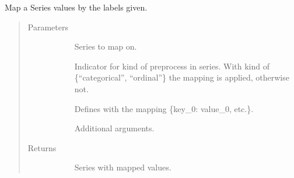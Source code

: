 \documentclass[letterpaper,10pt,english]{sphinxmanual}
\begin{document}
\begin{fulllineitems}
\label{\detokenize{autoapi/src/utils/preprocess/index:src.utils.preprocess.map_labels}}
Map a Series values by the labels given.
\begin{quote}\begin{description}
\item[{Parameters}] \leavevmode\begin{description}
\item[{}] \leavevmode
Series to map on.

\item[{}] \leavevmode
Indicator for kind of preprocess in series. With kind of \{“categorical”, “ordinal”\}  the mapping is applied,
otherwise not.

\item[{}] \leavevmode
Defines with the mapping \{key\_0: value\_0, etc.\}.

\item[{}] \leavevmode
Additional arguments.

\end{description}

\item[{Returns}] \leavevmode\begin{description}
\item[{}] \leavevmode
Series with mapped values.

\end{description}

\end{description}\end{quote}

\end{fulllineitems}

\end{document}
